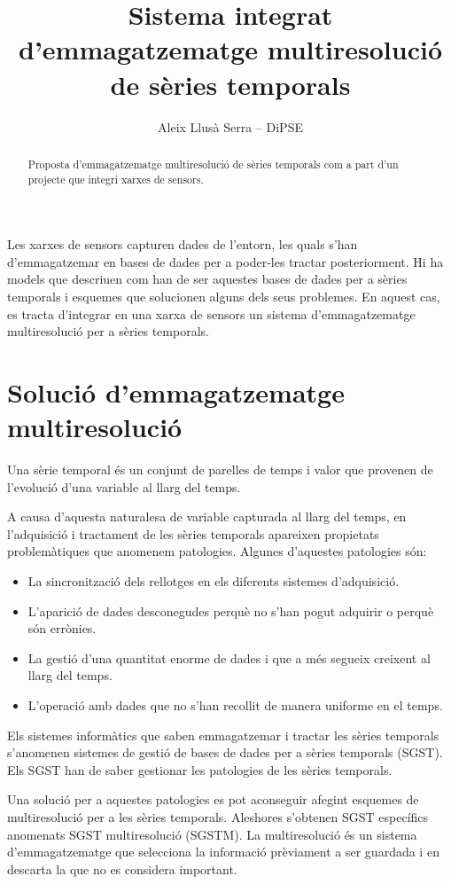 \documentclass[paper=a4,parskip=half]{scrartcl}
\title{Sistema integrat d'emmagatzematge multiresolució de sèries temporals}
\author{Aleix Llusà Serra -- DiPSE}
\begin{document}
\maketitle

\begin{abstract}
  Proposta d'emmagatzematge multiresolució de sèries temporals com a
  part d'un projecte que integri xarxes de sensors.
\end{abstract}


Les xarxes de sensors capturen dades de l'entorn, les quals s'han
d'emmagatzemar en bases de dades per a poder-les tractar
posteriorment. Hi ha models que descriuen com han de ser aquestes
bases de dades per a sèries temporals i esquemes que solucionen alguns
dels seus problemes. En aquest cas, es tracta d'integrar en una xarxa
de sensors un sistema d'emmagatzematge multiresolució per a sèries
temporals.




\section{Solució d'emmagatzematge multiresolució}

Una sèrie temporal és un conjunt de parelles de temps i valor que
provenen de l'evolució d'una variable al llarg del temps. 

A causa d'aquesta naturalesa de variable capturada al llarg del temps,
en l'adquisició i tractament de les sèries temporals apareixen
propietats problemàtiques que anomenem patologies.
Algunes d'aquestes patologies són:
\begin{itemize}
\item La sincronització dels rellotges en els diferents sistemes
  d'adquisició.
\item L'aparició de dades desconegudes perquè no s'han pogut adquirir
  o perquè són errònies.
\item La gestió d'una quantitat enorme de dades i que a més segueix
  creixent al llarg del temps.
\item L'operació amb dades que no s'han recollit de manera uniforme en
  el temps.
\end{itemize}


Els sistemes informàtics que saben emmagatzemar i tractar les sèries
temporals s'anomenen sistemes de gestió de bases de dades per a sèries
temporals (SGST). Els SGST han de saber gestionar les patologies de
les sèries temporals. 

Una solució per a aquestes patologies es pot aconseguir afegint
esquemes de multiresolució per a les sèries temporals. Aleshores
s'obtenen SGST específics anomenats SGST multiresolució (SGSTM).  La
multiresolució és un sistema d'emmagatzematge que selecciona la
informació prèviament a ser guardada i en descarta la que no es
considera important.
\end{document}
